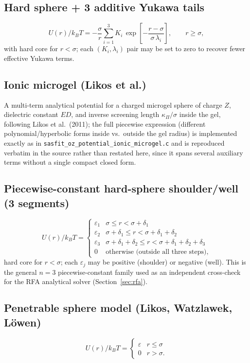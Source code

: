 \documentclass[11pt,a4paper]{article}
\newcommand{\code}[1]{\texttt{#1}}
\begin{document}
\subsection{Hard sphere + 3 additive Yukawa tails}
\begin{equation}
  U(r)/k_BT = -\frac{\sigma}{r}\sum_{i=1}^{3} K_i\,\exp\!\left[-\frac{r-\sigma}{\sigma\,\lambda_i}\right], \qquad r\ge\sigma,
\end{equation}
with hard core for $r<\sigma$; each $(K_i,\lambda_i)$ pair may be set to zero to
recover fewer effective Yukawa terms.

\subsection{Ionic microgel (Likos et al.)}
A multi-term analytical potential for a charged microgel sphere of charge $Z$,
dielectric constant $ED$, and inverse screening length $\kappa_\Pi/\sigma$
inside the gel, following Likos et al.\ (2011); the full piecewise expression
(different polynomial/hyperbolic forms inside vs.\ outside the gel radius) is
implemented exactly as in \code{sasfit\_oz\_potential\_ionic\_microgel.c} and is
reproduced verbatim in the source rather than restated here, since it spans
several auxiliary terms without a single compact closed form.

\subsection{Piecewise-constant hard-sphere shoulder/well (3 segments)}
\begin{equation}
  U(r)/k_BT =
  \begin{cases}
    \varepsilon_1 & \sigma\le r<\sigma+\delta_1\\
    \varepsilon_2 & \sigma+\delta_1\le r<\sigma+\delta_1+\delta_2\\
    \varepsilon_3 & \sigma+\delta_1+\delta_2\le r<\sigma+\delta_1+\delta_2+\delta_3\\
    0 & \text{otherwise (outside all three steps)},
  \end{cases}
\end{equation}
hard core for $r<\sigma$; each $\varepsilon_j$ may be positive (shoulder) or
negative (well). This is the general $n=3$ piecewise-constant family used as
an independent cross-check for the RFA analytical solver
(Section~\ref{sec:rfa}).

\subsection{Penetrable sphere model (Likos, Watzlawek, L\"owen) \cite{likos1998}}
\begin{equation}
  U(r)/k_BT = \begin{cases}\varepsilon & r\le\sigma\\ 0 & r>\sigma.\end{cases}
\end{equation}
\end{document}
